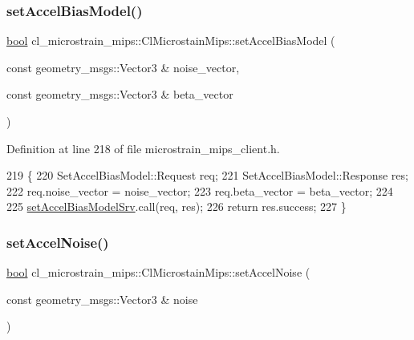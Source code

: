 \subsubsection{\texorpdfstring{set\+Accel\+Bias\+Model()}{setAccelBiasModel()}}
{\footnotesize\ttfamily \hyperlink{classbool}{bool} cl\+\_\+microstrain\+\_\+mips\+::\+Cl\+Microstain\+Mips\+::set\+Accel\+Bias\+Model (\begin{DoxyParamCaption}\item[{const geometry\+\_\+msgs\+::\+Vector3 \&}]{noise\+\_\+vector,  }\item[{const geometry\+\_\+msgs\+::\+Vector3 \&}]{beta\+\_\+vector }\end{DoxyParamCaption})\hspace{0.3cm}{\ttfamily [inline]}}



Definition at line 218 of file microstrain\+\_\+mips\+\_\+client.\+h.


\begin{DoxyCode}
219     \{
220         SetAccelBiasModel::Request req;
221         SetAccelBiasModel::Response res;
222         req.noise\_vector = noise\_vector;
223         req.beta\_vector = beta\_vector;
224 
225         \hyperlink{classcl__microstrain__mips_1_1ClMicrostainMips_a8d7c0f0a94dd6a25cac0130f8d9f55ff}{setAccelBiasModelSrv}.call(req, res);
226         \textcolor{keywordflow}{return} res.success;
227     \}
\end{DoxyCode}
\mbox{\label{classcl__microstrain__mips_1_1ClMicrostainMips_af003ab445879e23f969cca8e767a70f3}} 
\subsubsection{\texorpdfstring{set\+Accel\+Noise()}{setAccelNoise()}}
{\footnotesize\ttfamily \hyperlink{classbool}{bool} cl\+\_\+microstrain\+\_\+mips\+::\+Cl\+Microstain\+Mips\+::set\+Accel\+Noise (\begin{DoxyParamCaption}\item[{const geometry\+\_\+msgs\+::\+Vector3 \&}]{noise }\end{DoxyParamCaption})\hspace{0.3cm}{\ttfamily [inline]}}



